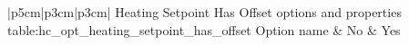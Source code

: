 \begin{customLongTable}{ |p{5cm}|p{3cm}|p{3cm}| }
{Heating Setpoint Has Offset options and properties} {table:hc_opt_heating_setpoint_has_offset}
{Option name & No & Yes}
\endhead
\hline
\end{customLongTable}
